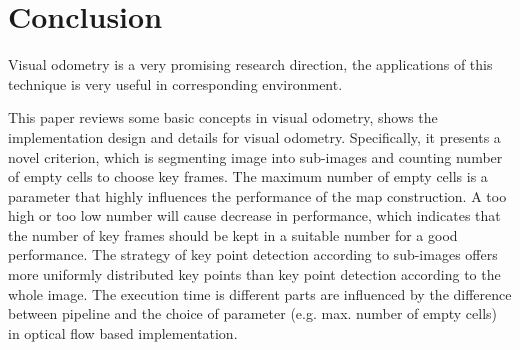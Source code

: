 \documentclass{easychair}
\begin{document}
\section{Conclusion}
Visual odometry is a very promising research direction, the applications of this technique is very useful in corresponding environment.

This paper reviews some basic concepts in visual odometry, shows the implementation design and details for visual odometry. Specifically, it presents a novel criterion, which is segmenting image into sub-images and counting number of empty cells to choose key frames. The maximum number of empty cells is a parameter that highly influences the performance of the map construction. A too high or too low number will cause decrease in performance, which indicates that the number of key frames should be kept in a suitable number for a good performance. The strategy of key point detection according to sub-images offers more uniformly distributed key points than key point detection according to the whole image. The execution time is different parts are influenced by the difference between pipeline and the choice of parameter (e.g. max. number of empty cells) in optical flow based implementation.
\end{document}
